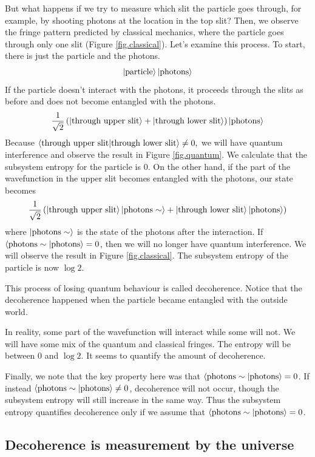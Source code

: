 But what happens if we try to measure which slit the particle goes through, for example, by shooting photons at the location in the top slit? Then, we observe the fringe pattern predicted by classical mechanics, where the particle goes through only one slit (Figure \ref{fig.classical}). Let’s examine this process. To start, there is just the particle and the photons.
\[\left|\text{particle}\right\rangle\left|\text{photons}\right\rangle\]
If the particle doesn’t interact with the photons, it proceeds through the slits as before and does not become entangled with the photons.
\[\frac{1}{\sqrt{2}}\left(\left|\text{through upper slit}\right\rangle + \left|\text{through lower slit}\right\rangle\right)\left|\text{photons}\right\rangle\]
Because \(\left\langle\text{through upper slit}|\text{through lower slit}\right\rangle \neq 0,\) we will have quantum interference and observe the result in Figure \ref{fig.quantum}. We calculate that the subsystem entropy for the particle is 0. 
On the other hand, if the part of the wavefunction in the upper slit becomes entangled with the photons, our state becomes
\[\frac{1}{\sqrt{2}}\left(\left|\text{through upper slit}\right\rangle\left|\text{photons} \sim\right\rangle + \left|\text{through lower slit}\right\rangle\left|\text{photons}\right\rangle\right)\]
where \(\left|\text{photons} \sim\right\rangle\)  is the state of the photons after the interaction. If \(\left\langle\text{photons} \sim|\text{photons}\right\rangle=0\), then we will no longer have quantum interference. We will observe the result in Figure \ref{fig.classical}. The subsystem entropy of the particle is now \(\log 2\).

This process of losing quantum behaviour is called decoherence. Notice that the decoherence happened when the particle became entangled with the outside world.

In reality, some part of the wavefunction will interact while some will not. We will have some mix of the quantum and classical fringes. The entropy will be between \(0\) and \(\log 2\). It seems to quantify the amount of decoherence.

Finally, we note that the key property here was that \(\left\langle\text{photons} \sim|\text{photons}\right\rangle=0\). If instead \(\left\langle\text{photons} \sim|\text{photons}\right\rangle\neq0\), decoherence will not occur, though the subsystem entropy will still increase in the same way. Thus the subsystem entropy quantifies decoherence only if we assume that \(\left\langle\text{photons} \sim|\text{photons}\right\rangle=0\).

\subsection{Decoherence is measurement by the universe}

